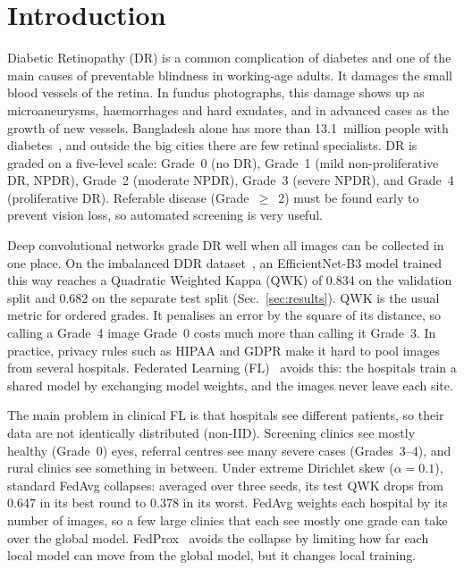 \section{Introduction}

Diabetic Retinopathy (DR) is a common complication of diabetes and one of the main
causes of preventable blindness in working-age adults. It damages the small blood
vessels of the retina. In fundus photographs, this damage shows up as
microaneurysms, haemorrhages and hard exudates, and in advanced cases as the growth
of new vessels. Bangladesh alone has more than 13.1~million people with
diabetes~\cite{idf2021}, and outside the big cities there are few retinal
specialists. DR is graded on a five-level scale: Grade~0 (no DR), Grade~1 (mild
non-proliferative DR, NPDR), Grade~2 (moderate NPDR), Grade~3 (severe NPDR), and
Grade~4 (proliferative DR). Referable disease (Grade~$\geq$~2) must be found early
to prevent vision loss, so automated screening is very useful.

Deep convolutional networks grade DR well when all images can be collected in one
place. On the imbalanced DDR dataset~\cite{li2019ddr}, an EfficientNet-B3 model
trained this way reaches a Quadratic Weighted Kappa (QWK) of 0.834 on the
validation split and 0.682 on the separate test split (Sec.~\ref{sec:results}).
QWK is the usual metric for ordered grades. It penalises an error by the square of
its distance, so calling a Grade~4 image Grade~0 costs much more than calling it
Grade~3. In practice, privacy rules such as HIPAA and GDPR make it hard to pool
images from several hospitals. Federated Learning (FL)~\cite{mcmahan2017fedavg}
avoids this: the hospitals train a shared model by exchanging model weights, and
the images never leave each site.

The main problem in clinical FL is that hospitals see different patients, so their
data are not identically distributed (non-IID). Screening clinics see mostly
healthy (Grade~0) eyes, referral centres see many severe cases (Grades~3--4), and
rural clinics see something in between. Under extreme Dirichlet skew
($\alpha=0.1$), standard FedAvg collapses: averaged over three seeds, its test QWK
drops from 0.647 in its best round to 0.378 in its worst. FedAvg weights each
hospital by its number of images, so a few large clinics that each see mostly one
grade can take over the global model. FedProx~\cite{li2020fedprox} avoids the
collapse by limiting how far each local model can move from the global model, but
it changes local training.

